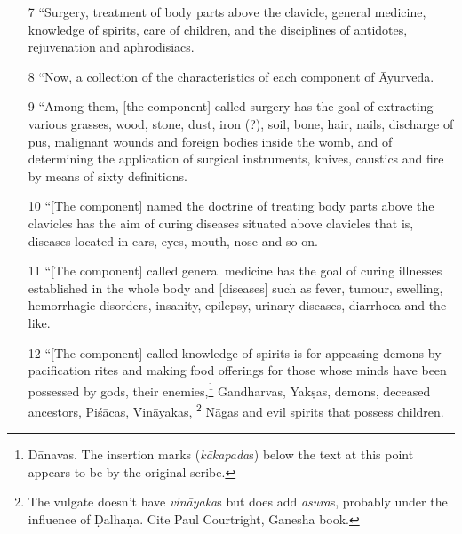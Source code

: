 \documentclass[12pt]{article}
\begin{document}
\begin{itemize}
    \item[7] “Surgery, treatment of body parts above the clavicle, general medicine, 
    knowledge of spirits, care of children, and the disciplines of antidotes, rejuvenation 
    and aphrodisiacs.
  
        \item[8] “Now,  a collection of the characteristics of each component of 
        Āyurveda.
    
        \item[9] “Among them, [the component] called surgery has the goal of 
        extracting 
        various grasses, wood, stone, dust, iron (?), soil, bone, hair, nails, discharge of 
        pus, malignant wounds and foreign bodies inside the womb, and of determining 
        the application of surgical instruments, knives, caustics and fire by means of 
        sixty definitions.
        
        \item[10] “[The component] named the doctrine of treating body parts above 
        the clavicles has the aim of curing diseases situated above clavicles that is,  
        diseases located in ears, eyes, mouth, nose and so on.
        
        \item[11] “[The component] called general medicine has the goal of curing 
        illnesses established in the whole body and [diseases] such as fever, tumour, 
        swelling, hemorrhagic disorders, insanity, epilepsy, urinary diseases, diarrhoea 
        and the like.
        
        \item[12] “[The component] called knowledge of spirits is for appeasing
demons by pacification rites and making food offerings for those whose
minds have been possessed by gods, their enemies,\footnote{Dānavas.  The
insertion marks (\emph{kākapada}s) below the text at this point appears to
be by the original scribe.} Gandharvas, Yakṣas, demons, deceased
ancestors, Piśācas, Vināyakas, \footnote{The vulgate doesn't have
\emph{vināyaka}s but does add \emph{asura}s, probably under the influence
of Ḍalhaṇa.  Cite Paul Courtright, Ganesha book.} Nāgas and evil spirits
that possess children. %
          

\end{itemize}
\end{document}
